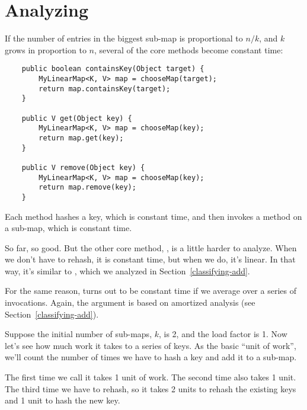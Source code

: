 \documentclass[12pt]{book}
\theoremstyle{exercise}
\begin{document}
\section{Analyzing }
\label{analyzing-myhashmap}


If the number of entries in the biggest sub-map is proportional to
$n/k$, and $k$ grows in proportion to $n$, several of the core
 methods become constant time:

\begin{verbatim}
    public boolean containsKey(Object target) {
        MyLinearMap<K, V> map = chooseMap(target);
        return map.containsKey(target);
    }

    public V get(Object key) {
        MyLinearMap<K, V> map = chooseMap(key);
        return map.get(key);
    }

    public V remove(Object key) {
        MyLinearMap<K, V> map = chooseMap(key);
        return map.remove(key);
    }
\end{verbatim}

Each method hashes a key, which is constant time, and then invokes a
method on a sub-map, which is constant time.


So far, so good. But the other core method, , is a little
harder to analyze. When we don't have to rehash, it is constant time,
but when we do, it's linear. In that way, it's similar to
, which we analyzed in Section~\ref{classifying-add}.


For the same reason,  turns out to be
constant time if we average over a series of invocations.
Again, the argument is based on amortized analysis 
(see Section~\ref{classifying-add}).


Suppose the initial number of sub-maps, $k$, is 2, and the load
factor is 1. Now let's see how much work it takes to  a
series of keys. As the basic ``unit of work'', we'll count the number of
times we have to hash a key and add it to a sub-map.


The first time we call  it takes 1 unit of work. The second
time also takes 1 unit. The third time we have to rehash, so it takes 2
units to rehash the existing keys and 1 unit to hash the new key.
\end{document}
